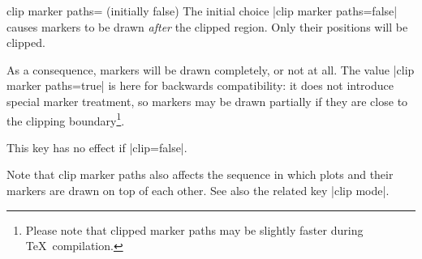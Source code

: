 \begin{pgfplotskey}{clip marker paths= (initially false)}
	The initial choice |clip marker paths=false| causes markers to be drawn \emph{after} the clipped region. Only their positions will be clipped. 
	
	As a consequence, markers will be drawn completely, or not at all. The value |clip marker paths=true| is here for backwards compatibility: it does not introduce special marker treatment, so markers may be drawn partially if they are close to the clipping boundary\footnote{Please note that clipped marker paths may be slightly faster during \TeX\ compilation.}.

	This key has no effect if |clip=false|.

	Note that clip marker paths also affects the sequence in which plots and their markers are drawn on top of each other. See also the related key |clip mode|.
\end{pgfplotskey}


